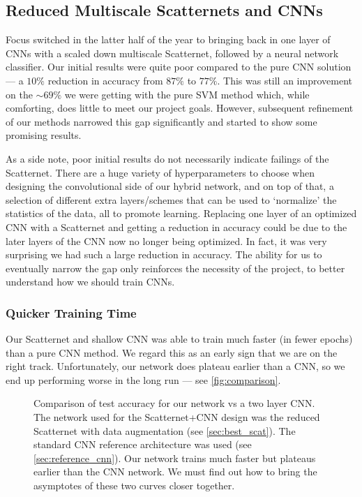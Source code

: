 \subsection{Reduced Multiscale Scatternets and CNNs}
  Focus switched in the latter half of the year to bringing back in one layer
  of CNNs with a scaled down multiscale Scatternet, followed by a neural
  network classifier.  Our initial results were quite poor compared to the pure
  CNN solution --- a $10\%$ reduction in accuracy from $87\%$ to $77\%$. This was
  still an improvement on the $\sim 69\%$ we were getting with the pure SVM
  method which, while comforting, does little to meet our project goals.
  However, subsequent refinement of our methods narrowed this gap
  significantly and started to show some promising results.

  As a side note, poor initial results do not necessarily indicate failings of
  the Scatternet. There are a huge variety of hyperparameters to choose when
  designing the convolutional side of our hybrid network, and on top of that,
  a selection of different extra layers/schemes that can be used to `normalize'
  the statistics of the data, all to promote learning. Replacing one layer of
  an optimized CNN with a Scatternet and getting a reduction in accuracy could
  be due to the later layers of the CNN now no longer being optimized. In fact,
  it was very surprising we had such a large reduction in accuracy. The ability
  for us to eventually narrow the gap only reinforces the necessity of the
  project, to better understand how we should train CNNs.

\subsubsection{Quicker Training Time}
  Our Scatternet and shallow CNN was able to train much faster (in fewer
  epochs) than a pure CNN method. We regard this as an early sign that we are
  on the right track. Unfortunately, our network does plateau earlier than
  a CNN, so we end up performing worse in the long run --- see
  \autoref{fig:comparison}.

  \begin{figure}
    \centering
      \caption[Comparison of test accuracy for our network vs a two layer CNN]
              {Comparison of test accuracy for our network vs a two layer
              CNN\@.
              The network used for the Scatternet+CNN design was the reduced
              Scatternet with data augmentation (see \autoref{sec:best_scat}). The
              standard CNN reference architecture was used (see
              \autoref{sec:reference_cnn}). Our network trains much faster but plateaus
              earlier than the CNN network. We must find out how to bring the
              asymptotes of these two curves closer together.}
      \label{fig:comparison}
  \end{figure}



